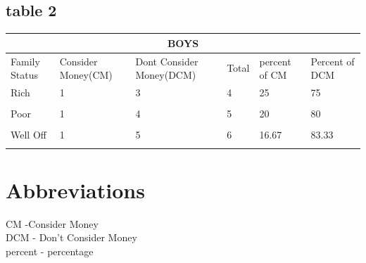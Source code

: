 \documentclass[12pt,letterpaper]{article}
\begin{document}
{		\subsection{table 2}
		
		
		\begin{tabular}{ |p{1cm}||p{2cm}|p{2cm}|p{1cm}|p{2cm}|p{1cm}  }
			\hline
			\multicolumn{6}{|c|}{BOYS} \\
			\hline
			Family Status & Consider Money(CM)&Dont Consider Money(DCM) &Total& percent of CM& Percent of DCM\\
			\hline
			Rich   & 1   &3&  4&25&75\\\\
			Poor&1&4&5&20&80\\\\
			Well Off &1&5&6&16.67&83.33\\\\
			\hline
		\end{tabular}
		
		\section{Abbreviations}
		CM -\space Consider Money
		\\
		DCM - \space Don't Consider Money
		\\
		percent - \space percentage
}
\end{document}
